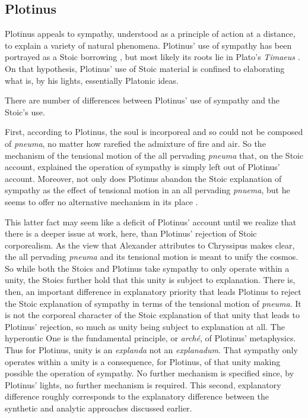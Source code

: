 \subsection{Plotinus} %
\label{sec:plotinus}

Plotinus appeals to sympathy, understood as a principle of action at a distance, to explain a variety of natural phenomena. Plotinus' use of sympathy has been portrayed as a Stoic borrowing \citep{Emilsson:1988uq,Ierodiakonou:2006gf}, but most likely its roots lie in Plato's \emph{Timaeus} \citep{Emilsson:2015wf}. On that hypothesis, Plotinus' use of Stoic material is confined to elaborating what is, by his lights, essentially Platonic ideas.

There are number of differences between Plotinus' use of sympathy and the Stoic's use.

First, according to Plotinus, the soul is incorporeal and so could not be composed of \emph{pneuma}, no matter how rarefied the admixture of fire and air. So the mechanism of the tensional motion of the all pervading \emph{pneuma} that, on the Stoic account, explained the operation of sympathy is simply left out of Plotinus' account. Moreover, not only does Plotinus abandon the Stoic explanation of sympathy as the effect of tensional motion in an all pervading \emph{pnuema}, but he seems to offer no alternative mechanism in its place \citep[48]{Emilsson:1988uq}.

This latter fact may seem like a deficit of Plotinus' account until we realize that there is a deeper issue at work, here, than Plotinus' rejection of Stoic corporealism. As the view that Alexander attributes to Chryssipus makes clear, the all pervading \emph{pneuma} and its tensional motion is meant to unify the cosmos. So while both the Stoics and Plotinus take sympathy to only operate within a unity, the Stoics further hold that this unity is subject to explanation. There is, then, an important difference in explanatory priority that leads Plotinus to reject the Stoic explanation of sympathy in terms of the tensional motion of \emph{pneuma}. It is not the corporeal character of the Stoic explanation of that unity that leads to Plotinus' rejection, so much as unity being subject to explanation at all. The hyperontic One is the fundamental principle, or \emph{arch\'{e}}, of Plotinus' metaphysics. Thus for Plotinus, unity is an \emph{explanda} not an \emph{explanadum}. That sympathy only operates within a unity is a consequence, for Plotinus, of that unity making possible the operation of sympathy. No further mechanism is specified since, by Plotinus' lights, no further mechanism is required. This second, explanatory difference roughly corresponds to the explanatory difference between the synthetic and analytic approaches discussed earlier.


